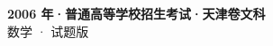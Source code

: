 \documentclass[zihao=-4, a4paper]{ctexart}
\begin{document}
\begin{center}
  {\Large\bfseries 2006 年·普通高等学校招生考试·天津卷文科}\\[4pt]
  {\large 数学 · 试题版}
\end{center}
\medskip
{}

\end{document}
